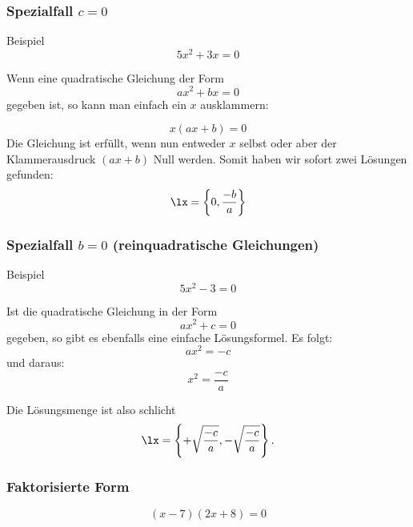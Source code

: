 
\subsubsection{Spezialfall $c=0$}

Beispiel
$$5x^2 + 3x = 0$$



Wenn eine quadratische Gleichung der Form
$$ax^2 +bx = 0$$
gegeben ist, so kann man einfach ein $x$ ausklammern:

$$x(ax+b)=0$$
 Die Gleichung ist erfüllt, wenn nun entweder $x$ selbst oder aber
 der Klammerausdruck $(ax+b)$ Null werden. Somit haben wir sofort zwei
 Lösungen gefunden:
 $$\lx=\left\{0, \frac{-b}{a}\right\}$$

 \newpage

 
 \subsubsection{Spezialfall $b=0$ (reinquadratische Gleichungen)}

Beispiel
$$5x^2 - 3 = 0$$





Ist die quadratische Gleichung in der Form
 $$ax^2 + c = 0$$
 gegeben, so gibt es ebenfalls eine einfache Lösungsformel. Es folgt:
 $$ax^2 = -c$$
 und daraus:
 $$x^2 = \frac{-c}{a}$$

 Die Lösungsmenge ist also schlicht
 $$\lx=\left\{ + \sqrt{\frac{-c}{a}}, -\sqrt{\frac{-c}{a}} \right\}.$$

\newpage

 \subsubsection{Faktorisierte Form}

$$(x-7)(2x+8) = 0$$

\newpage
